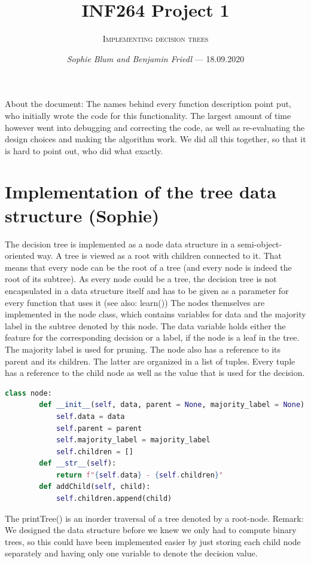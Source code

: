 \documentclass[12pt,a4paper]{scrartcl}		%
\newcommand\svthema{INF264 Project 1}
\newcommand\svperson{Sophie Blum and Benjamin Friedl}
\newcommand\svdatum{18.09.2020}
\newcommand\lvname{Implementing decision trees}
\begin{document}
\title{ \svthema}
\author{\textsc{\lvname}}
\date{ \small \textsl{\svperson} --- \svdatum }
\maketitle

\abstract
About the document:
The names behind every function description point put, who initially wrote the code for this functionality. 
The largest amount of time however went into debugging and correcting the code, as well as re-evaluating the 
design choices and making the algorithm work. We did all this together, so that it is hard to point out, who 
did what exactly.

\section{Implementation of the tree data structure (Sophie)}
The decision tree is implemented as a node data structure in a semi-object-oriented way. A tree is viewed as 
a root with children connected to it. That means that every node can be the root of a tree (and every node is 
indeed the root of its subtree). As every node could be a tree, the decision tree is not encapsulated in a 
data structure itself and has to be given as a parameter for every function that uses it (see also: learn())
The nodes themselves are implemented in the node class, which contains variables for data and the majority 
label in the subtree denoted by this node. 
The data variable holds either the feature for the corresponding decision or a label, if the node is a leaf 
in the tree.
The majority label is used for pruning.
The node also has a reference to its parent and its children. The latter are organized in a list of tuples. 
Every tuple has a reference to the child node as well as the value that is used for the decision. 

\begin{lstlisting}[language=Python]
    class node: 
        def __init__(self, data, parent = None, majority_label = None):
            self.data = data
            self.parent = parent
            self.majority_label = majority_label
            self.children = []
        def __str__(self):
            return f"{self.data} - {self.children}"
        def addChild(self, child):
            self.children.append(child)
\end{lstlisting}

The printTree() is an inorder traversal of a tree denoted by a root-node. 
Remark: We designed the data structure before we knew we only had to compute binary trees, so this could have 
been implemented easier by just storing each child node separately and having only one variable to denote the 
decision value.
\end{document}
